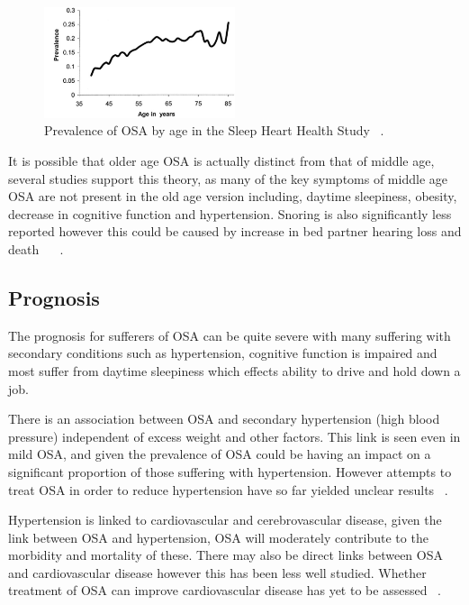 \begin{figure}[h]
\centering 
\includegraphics[width=0.5\textwidth]{drawings/prevalenceage}
\caption{Prevalence of OSA by age in the Sleep Heart Health Study ~\cite{young2002predictors}.}
\label{fig: prevalence}
\end{figure}

It is possible that older age OSA is actually distinct from that of middle age, several studies support this theory, as many of the key symptoms of middle age OSA are not present in the old age version including, daytime sleepiness, obesity, decrease in cognitive function and hypertension. Snoring is also significantly less reported however this could be caused by increase in bed partner hearing loss and death ~\cite{enright1996prevalence} ~\cite{young1996sleep}.

\subsection{Prognosis}
The prognosis for sufferers of OSA can be quite severe with many suffering with secondary conditions such as hypertension, cognitive function is impaired and most suffer from daytime sleepiness which effects ability to drive and hold down a job.

There is an association between OSA and secondary hypertension (high blood pressure) independent of excess weight and other factors. This link is seen even in mild OSA, and given the prevalence of OSA could be having an impact on a significant proportion of those suffering with hypertension. However attempts to treat OSA in order to reduce hypertension have so far yielded unclear results ~\cite{pankow2000sleep}.

Hypertension is linked to cardiovascular and cerebrovascular disease, given the link between OSA and hypertension, OSA will moderately contribute to the morbidity and mortality of these. There may also be direct links between OSA and cardiovascular disease however this has been less well studied. Whether treatment of OSA can improve cardiovascular disease has yet to be assessed ~\cite{hel1988mortality}.


